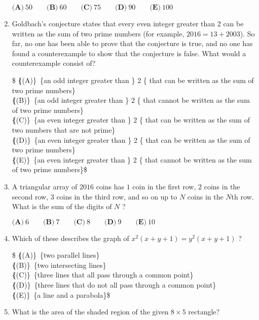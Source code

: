 \documentclass{article}
\begin{document}
\begin{enumerate}[label=\arabic*., itemsep=0.5em]
$\textbf{(A)}\ 50\qquad\textbf{(B)}\ 60\qquad\textbf{(C)}\ 75\qquad\textbf{(D)}\ 90\qquad\textbf{(E)}\ 100$\par \vspace{0.5em}\item Goldbach's conjecture states that every even integer greater than 2 can be written as the sum of two prime numbers (for example, $2016=13+2003$). So far, no one has been able to prove that the conjecture is true, and no one has found a counterexample to show that the conjecture is false. What would a counterexample consist of?

\$ \textbf\{(A)\}\ \text\{an odd integer greater than \} 2 \text\{ that can be written as the sum of two prime numbers\}\\
\qquad\textbf\{(B)\}\ \text\{an odd integer greater than \} 2 \text\{ that cannot be written as the sum of two prime numbers\}\\
\qquad\textbf\{(C)\}\ \text\{an even integer greater than \} 2 \text\{ that can be written as the sum of two numbers that are not prime\}\\
\qquad\textbf\{(D)\}\ \text\{an even integer greater than \} 2 \text\{ that can be written as the sum of two prime numbers\}\\
\qquad\textbf\{(E)\}\ \text\{an even integer greater than \} 2 \text\{ that cannot be written as the sum of two prime numbers\}\$\par \vspace{0.5em}\item A triangular array of $2016$ coins has $1$ coin in the first row, $2$ coins in the second row, $3$ coins in the third row, and so on up to $N$ coins in the $N$th row. What is the sum of the digits of $N$ ?

$\textbf{(A)}\ 6\qquad\textbf{(B)}\ 7\qquad\textbf{(C)}\ 8\qquad\textbf{(D)}\ 9\qquad\textbf{(E)}\ 10$\par \vspace{0.5em}\item Which of these describes the graph of $x^2(x+y+1)=y^2(x+y+1)$ ?

\$ \textbf\{(A)\}\ \text\{two parallel lines\}\\
\qquad\textbf\{(B)\}\ \text\{two intersecting lines\}\\
\qquad\textbf\{(C)\}\ \text\{three lines that all pass through a common point\}\\
\qquad\textbf\{(D)\}\ \text\{three lines that do not all pass through a common point\}\\
\qquad\textbf\{(E)\}\ \text\{a line and a parabola\}\$\par \vspace{0.5em}\item What is the area of the shaded region of the given $8\times 5$ rectangle?



\end{enumerate}
\end{document}
